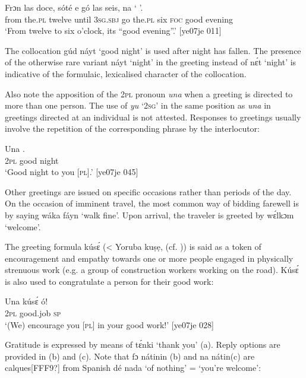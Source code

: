 \ea%
    \label{ex:key:1691}
    \gll Frɔn    las    doce,  sóté    e    gó  las    seis,
na  ‘    ’.\\
from  the.\textsc{pl}  twelve  until  \textsc{3sg.sbj}  go  the.\textsc{pl}  six  
\textsc{foc}  good  evening\\
\glt ‘From twelve to six o’clock, its “good evening”.’ [ye07je 011]
\z

The collocation gúd náyt ‘good night’ is used after night has fallen. The presence of the otherwise rare variant náyt ‘night’ in the greeting instead of nɛ́t ‘night’ is indicative of the formulaic, lexicalised character of the collocation. 


Also note the apposition of the \textsc{2pl} pronoun \textit{una} when a greeting is directed to more than one person. The use of \textit{yu} ‘\textsc{2sg}’ in the same position as \textit{una} in greetings directed at an individual is not attested. Responses to greetings usually involve the repetition of the corresponding phrase by the interlocutor:



\ea%
    \label{ex:key:1692}
    \gll Una        .\\
\textsc{2pl}    good  night\\

\glt ‘Good night to you [\textsc{pl}].’ [ye07je 045]
\z

Other greetings are issued on specific occasions rather than periods of the day. On the occasion of imminent travel, the most common way of bidding farewell is by saying wáka fáyn ‘walk fine’. Upon arrival, the traveler is greeted by wɛ́lkɔm ‘welcome’. 

The greeting formula kúsɛ́ (< Yoruba kuṣẹ,  (cf. \citealt{Abraham1958})) is said as a token of encouragement and empathy towards one or more people engaged in physically strenuous work (e.g. a group of construction workers working on the road). Kúsɛ́ is also used to congratulate a person for their good work:


\ea%
    \label{ex:key:1693}
    \gll Una  kúsɛ́  ó!\\
\textsc{2pl}  good.job  \textsc{sp}\\

\glt ‘(We) encourage you [\textsc{pl}] in your good work!’ [ye07je 028]
\z

Gratitude is expressed by means of tɛ́nki ‘thank you’ (a). Reply options are provided in (b) and (c). Note that fɔ nátinin (b) and na nátin(c) are calques[FFF9?] from Spanish dé nada ‘of nothing’ = ‘you’re welcome’: 


